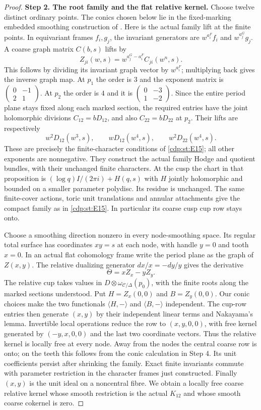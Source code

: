 \begin{proof}
\noindent\textbf{Step 2. The root family and the flat relative kernel.}
Choose twelve distinct ordinary points. The conics chosen below lie
in the fixed-marking embedded smoothing construction of
\cite[Proposition labelled \texttt{comb}]{Viaclovsky2026Combs}.
Here is the actual family lift at the finite points. In equivariant
frames $f_i,g_j$, the invariant generators are $w^{a_i^F}f_i$ and
$w^{a_j^G}g_j$. A coarse graph matrix $C(b,s)$ lifts by
\[
 Z_{ji}(w,s)=w^{a_j^G-a_i^F}C_{ji}(w^n,s).
\]
This follows by dividing its invariant graph vector by
$w^{a_i^F}$; multiplying back gives the inverse graph map.
At $p_1$ the order is $3$ and the exponent matrix is
$\left(\begin{smallmatrix}0&-1\\2&1\end{smallmatrix}\right)$.
At $p_2$ the order is $4$ and it is
$\left(\begin{smallmatrix}0&-3\\1&-2\end{smallmatrix}\right)$.
Since the entire period plane stays fixed along each marked section,
the required entries have the joint holomorphic divisions
$C_{12}=bD_{12}$, and also $C_{22}=bD_{22}$ at $p_2$.
Their lifts are respectively
\[
 w^2D_{12}(w^3,s),\qquad
 wD_{12}(w^4,s),\qquad w^2D_{22}(w^4,s).
\]
These are precisely the finite-character conditions of
\ref{cdp:st:E15}; all other exponents are nonnegative.
They construct the actual family Hodge and quotient bundles, with
their unchanged finite characters. At the cusp the chart in that
proposition is $(\log q)I/(2\pi i)+H(q,s)$ with $H$ jointly
holomorphic and bounded on a smaller parameter polydisc. Its residue
is unchanged. The same finite-cover actions, toric unit translations
and annular attachments give the compact family as in
\ref{cdp:st:E15}. In particular its coarse cusp cup row stays onto.

Choose a smoothing direction nonzero in every node-smoothing space.
Its regular total surface has coordinates $xy=s$ at each node,
with handle $y=0$ and tooth $x=0$. In an actual flat cohomology
frame write the period plane as the graph of $Z(x,y)$.
The relative dualizing generator $dx/x=-dy/y$ gives the derivative
\[
 \Theta=xZ_x-yZ_y.
\]
The relative cup takes values in
$D\otimes\omega_{\mathcal C/\Delta}(p_0)$, with the finite roots
along the marked sections understood. Put $H=Z_x(0,0)$ and
$B=Z_y(0,0)$. Our conic choices make the two functionals
$\langle H,-\rangle$ and $\langle B,-\rangle$ independent.
The cup-row entries then generate $(x,y)$ by their independent
linear terms and Nakayama's lemma. Invertible local operations
reduce the row to $(x,y,0,0)$, with free kernel generated by
$(-y,x,0,0)$ and the last two coordinate vectors.
Thus the relative kernel is locally free at every node.
Away from the nodes the central coarse row is onto; on the teeth
this follows from the conic calculation in Step 4. Its unit
coefficients persist after shrinking the family. Exact finite
invariants commute with parameter restriction in the character
frames just constructed. Finally $(x,y)$ is the unit ideal on a
noncentral fibre. We obtain a locally free coarse relative kernel
whose smooth restriction is the actual $K_{12}$ and whose smooth
coarse cokernel is zero.


\end{proof}
